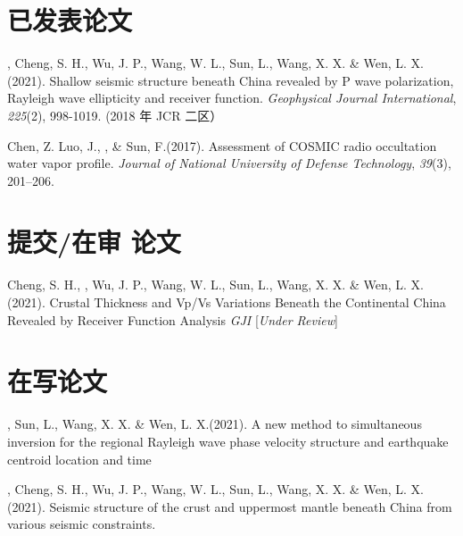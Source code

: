 \newcommand{\Revision}{\textit{under revision}}
\newcommand{\CS}{*} %
\newcommand{\CF}{\textsuperscript{\#}} %


\section*{已发表论文}

\begin{etaremune}
\item
    \Xiao, Cheng, S. H., Wu, J. P., Wang, W. L., Sun, L., Wang, X. X. \& Wen, L. X.(2021).
    Shallow seismic structure beneath China revealed by P wave polarization, Rayleigh wave ellipticity and receiver function.
    \textit{Geophysical Journal International}, \textit{225}(2), 998-1019. (2018 年 JCR 二区）
\item
    Chen, Z. Luo, J.,  \Xiao, \& Sun, F.(2017).
    Assessment of COSMIC radio occultation water vapor profile.
    \textit{Journal of National University of Defense Technology}, \textit{39}(3), 201--206. 
\end{etaremune}

\section*{提交/在审 论文}
\begin{etaremune}
\item
    Cheng, S. H., \Xiao, Wu, J. P., Wang, W. L., Sun, L., Wang, X. X. \& Wen, L. X.(2021).
    Crustal Thickness and Vp/Vs Variations Beneath the Continental China Revealed by Receiver Function Analysis
    \textit{GJI} [\textit{Under Review}]
\end{etaremune}

\section*{在写论文}
\begin{etaremune}
\item
    \Xiao, Sun, L., Wang, X. X. \& Wen, L. X.(2021).
    A new method to simultaneous inversion for the regional Rayleigh wave phase velocity structure and earthquake centroid location and time
\item
    \Xiao, Cheng, S. H., Wu, J. P., Wang, W. L., Sun, L., Wang, X. X. \& Wen, L. X.(2021).
    Seismic structure of the crust and uppermost mantle beneath China from various seismic constraints.
\end{etaremune}


